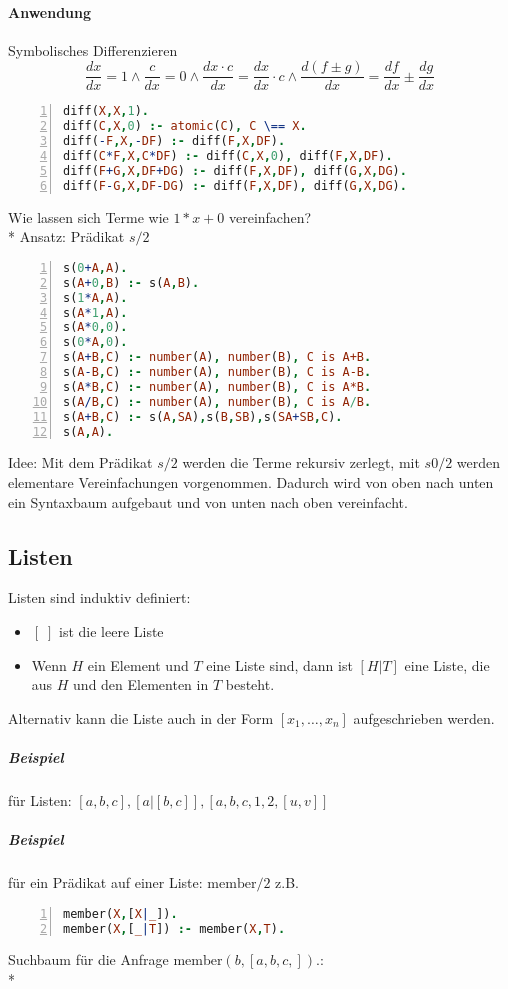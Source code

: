 \documentclass[a4paper]{scrartcl}
\begin{document}
\paragraph{Anwendung} Symbolisches Differenzieren \[\frac{dx}{dx} = 1 \wedge \frac{c}{dx} = 0 \wedge \frac{dx \cdot c}{dx} = \frac{dx}{dx} \cdot c \wedge \frac{d(f\pm g)}{dx} = \frac{df}{dx} \pm \frac{dg}{dx}\]
\begin{lstlisting}[numbers=left, tabsize=4, language=Prolog]
diff(X,X,1).
diff(C,X,0) :- atomic(C), C \== X.
diff(-F,X,-DF) :- diff(F,X,DF).
diff(C*F,X,C*DF) :- diff(C,X,0), diff(F,X,DF).
diff(F+G,X,DF+DG) :- diff(F,X,DF), diff(G,X,DG).
diff(F-G,X,DF-DG) :- diff(F,X,DF), diff(G,X,DG).
\end{lstlisting}
Wie lassen sich Terme wie $1*x+0$ vereinfachen?\\*
Ansatz: Prädikat $s/2$
\begin{lstlisting}[numbers=left, tabsize=4, language=Prolog]
s(0+A,A).
s(A+0,B) :- s(A,B).
s(1*A,A).
s(A*1,A).
s(A*0,0).
s(0*A,0).
s(A+B,C) :- number(A), number(B), C is A+B.
s(A-B,C) :- number(A), number(B), C is A-B.
s(A*B,C) :- number(A), number(B), C is A*B.
s(A/B,C) :- number(A), number(B), C is A/B.
s(A+B,C) :- s(A,SA),s(B,SB),s(SA+SB,C).
s(A,A).
\end{lstlisting}
Idee: Mit dem Prädikat $s/2$ werden die Terme rekursiv zerlegt, mit $s0/2$ werden elementare Vereinfachungen vorgenommen. Dadurch wird von oben nach unten ein Syntaxbaum aufgebaut und von unten nach oben vereinfacht.

\subsection{Listen}
Listen sind induktiv definiert:
\begin{itemize}
\item $[\; ]$ ist die leere Liste
\item Wenn $H$ ein Element und $T$ eine Liste sind, dann ist $[H|T]$ eine Liste, die aus $H$ und den Elementen in $T$ besteht.
\end{itemize}
Alternativ kann die Liste auch in der Form $[x_1,\dots,x_n]$ aufgeschrieben werden.
\subparagraph{Beispiel} für Listen: $[a,b,c], [a|[b,c]], [a,b,c,1,2,[u,v]]$
\subparagraph{Beispiel} für ein Prädikat auf einer Liste: $\text{member} /2$ z.B.
\begin{lstlisting}[numbers=left, tabsize=4, language=Prolog]
member(X,[X|_]).
member(X,[_|T]) :- member(X,T).
\end{lstlisting}
Suchbaum für die Anfrage $\text{member}(b,[a,b,c,]).$:\\*
\end{document}
